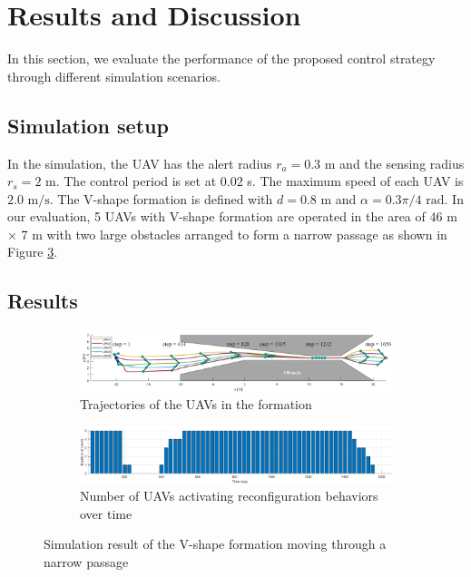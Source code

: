 \section{Results and Discussion} \label{sec:0result}
In this section, we evaluate the performance of the proposed control strategy through different simulation scenarios.

\subsection{Simulation setup}
In the simulation, the UAV has the alert radius $r_a = 0.3$ m and the sensing radius $r_s = 2$ m. The control period is set at $0.02$ s. The maximum speed of each UAV is $2.0 \text{ m/s}$. The V-shape formation is defined with $d=0.8 \text{ m}$ and $\alpha=0.3\pi/4 \text{ rad}$. In our evaluation, 5 UAVs with V-shape formation are operated in the area of 46 m $\times$ 7 m with two large obstacles arranged to form a narrow passage as shown in Figure \ref{fig:chap2_result}.

\subsection{Results}
\begin{figure}
    \centering
    \begin{subfigure}[b]{\textwidth}
        \includegraphics[width=\textwidth]{paper1/images/result.png}
        \caption{Trajectories of the UAVs in the formation}
        \label{fig:chap2_motion}
    \end{subfigure}
    \begin{subfigure}[b]{\textwidth}
        \includegraphics[width=\textwidth]{paper1/images/number.png}
        \caption{Number of UAVs activating reconfiguration behaviors over time}
        \label{fig:chap2_number}
    \end{subfigure}
    \caption{Simulation result of the V-shape formation moving through a narrow passage}
    \label{fig:chap2_result}
\end{figure}


